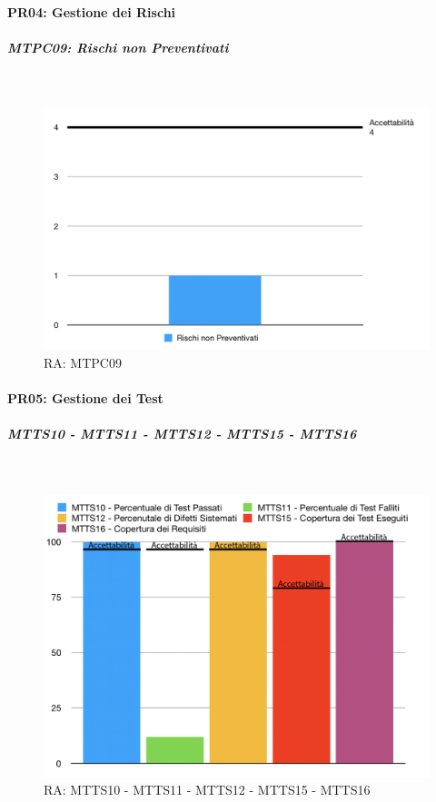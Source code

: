 \paragraph{PR04: Gestione dei Rischi}
\subparagraph{MTPC09: Rischi non Preventivati} \-\\

\begin{figure}[H]
	\begin{center}
		\includegraphics[scale=0.5]{./images/grafici_RA/MTPC09.png} 
		\caption{RA: MTPC09}
	\end{center}
\end{figure}

\pagebreak

\paragraph{PR05: Gestione dei Test}
\subparagraph{MTTS10 - MTTS11 - MTTS12 - MTTS15 - MTTS16} \-\\

\begin{figure}[H]
	\begin{center}
		\includegraphics[scale=0.5]{./images/grafici_RA/PR05_percentuali.png} 
		\caption{RA: MTTS10 - MTTS11 - MTTS12 - MTTS15 - MTTS16}
	\end{center}
\end{figure}

